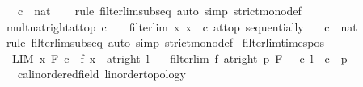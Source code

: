 \begin{isabellebody}
\ \ \ c\ {\isacharcolon}{\kern0pt}{\isacharcolon}{\kern0pt}\ nat\isanewline
%
\isadelimproof
\ \ %
\endisadelimproof
%
\isatagproof
{}\isamarkupfalse%
\ {\isacharparenleft}{\kern0pt}rule\ filterlim{\isacharunderscore}{\kern0pt}subseq{\isacharparenright}{\kern0pt}\ {\isacharparenleft}{\kern0pt}auto\ simp{\isacharcolon}{\kern0pt}\ strict{\isacharunderscore}{\kern0pt}mono{\isacharunderscore}{\kern0pt}def{\isacharparenright}{\kern0pt}%
\endisatagproof
{\isafoldproof}%
%
\isadelimproof
\isanewline
%
\endisadelimproof
\isanewline
{}\isamarkupfalse%
\ mult{\isacharunderscore}{\kern0pt}nat{\isacharunderscore}{\kern0pt}right{\isacharunderscore}{\kern0pt}at{\isacharunderscore}{\kern0pt}top{\isacharcolon}{\kern0pt}\ {\isachardoublequoteopen}c\ {\isachargreater}{\kern0pt}\ {}\ {\isasymLongrightarrow}\ filterlim\ {\isacharparenleft}{\kern0pt}{\isasymlambda}x{\isachardot}{\kern0pt}\ x\ {\isacharasterisk}{\kern0pt}\ c{\isacharparenright}{\kern0pt}\ at{\isacharunderscore}{\kern0pt}top\ sequentially{\isachardoublequoteclose}\isanewline
\ \ \ c\ {\isacharcolon}{\kern0pt}{\isacharcolon}{\kern0pt}\ nat\isanewline
%
\isadelimproof
\ \ %
\endisadelimproof
%
\isatagproof
{}\isamarkupfalse%
\ {\isacharparenleft}{\kern0pt}rule\ filterlim{\isacharunderscore}{\kern0pt}subseq{\isacharparenright}{\kern0pt}\ {\isacharparenleft}{\kern0pt}auto\ simp{\isacharcolon}{\kern0pt}\ strict{\isacharunderscore}{\kern0pt}mono{\isacharunderscore}{\kern0pt}def{\isacharparenright}{\kern0pt}%
\endisatagproof
{\isafoldproof}%
%
\isadelimproof
\isanewline
%
\endisadelimproof
\isanewline
{}\isamarkupfalse%
\ filterlim{\isacharunderscore}{\kern0pt}times{\isacharunderscore}{\kern0pt}pos{\isacharcolon}{\kern0pt}\isanewline
\ \ {\isachardoublequoteopen}LIM\ x\ F{}{\isachardot}{\kern0pt}\ c\ {\isacharasterisk}{\kern0pt}\ f\ x\ {\isacharcolon}{\kern0pt}{\isachargreater}{\kern0pt}\ at{\isacharunderscore}{\kern0pt}right\ l{\isachardoublequoteclose}\isanewline
\ \ \ {\isachardoublequoteopen}filterlim\ f\ {\isacharparenleft}{\kern0pt}at{\isacharunderscore}{\kern0pt}right\ p{\isacharparenright}{\kern0pt}\ F{}{\isachardoublequoteclose}\ {\isachardoublequoteopen}{}\ {\isacharless}{\kern0pt}\ c{\isachardoublequoteclose}\ {\isachardoublequoteopen}l\ {\isacharequal}{\kern0pt}\ c\ {\isacharasterisk}{\kern0pt}\ p{\isachardoublequoteclose}\isanewline
\ \ \ c{\isacharcolon}{\kern0pt}{\isacharcolon}{\kern0pt}{\isachardoublequoteopen}{\isacharprime}{\kern0pt}a{\isacharcolon}{\kern0pt}{\isacharcolon}{\kern0pt}{\isacharbraceleft}{\kern0pt}linordered{\isacharunderscore}{\kern0pt}field{\isacharcomma}{\kern0pt}\ linorder{\isacharunderscore}{\kern0pt}topology{\isacharbraceright}{\kern0pt}{\isachardoublequoteclose}\isanewline

\end{isabellebody}
